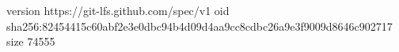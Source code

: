 version https://git-lfs.github.com/spec/v1
oid sha256:82454415c60abf2e3e0dbc94b4d09d4aa9cc8cdbc26a9e3f9009d8646c902717
size 74555

